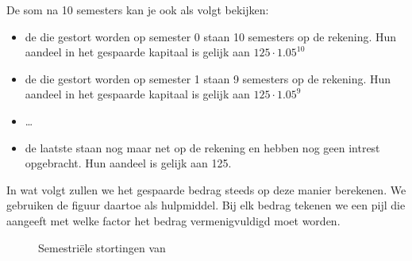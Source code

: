 De som na 10 semesters kan je ook als volgt bekijken: 
\begin{itemize}
\item de \euros{\textcolor{red}{125}} die gestort worden op semester 0 staan 10 semesters op de rekening. Hun aandeel in het gespaarde kapitaal is gelijk aan $125\cdot \num{1.05}^{10}$
\item de \euros{\textcolor{orange}{125}} die gestort worden op semester 1 staan 9 semesters op de rekening. Hun aandeel in het gespaarde kapitaal is gelijk aan $125\cdot \num{1.05}^{9}$
\item \dots
\item de laatste \euros{\textcolor{blue}{125}} staan nog maar net op de rekening en hebben nog geen intrest opgebracht. Hun aandeel is gelijk aan 125.
\end{itemize}
In wat volgt zullen we het gespaarde bedrag steeds op deze manier berekenen. We gebruiken de figuur daartoe als hulpmiddel. Bij elk bedrag tekenen we een pijl die aangeeft met welke factor het bedrag vermenigvuldigd moet worden. 


    \begin{figure}[htb]
            \centering
{}
        \caption{Semestri\"{e}le stortingen van }
        \label{fig:tt1}
    \end{figure}
    \setcounter{tijd}{0}


